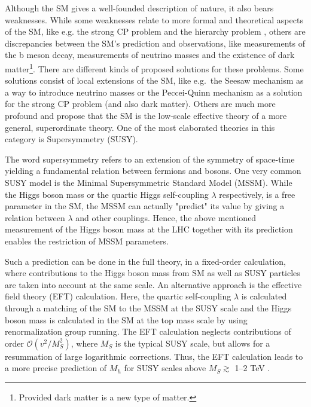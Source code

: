 \documentclass[a4paper,12pt]{book}
\begin{document}
Although the SM gives a well-founded description of nature, it also bears weaknesses. While some weaknesses relate to more formal and theoretical aspects of the SM, like e.g. the strong CP problem \cite{strongcp} and the hierarchy problem \cite{hierarchy}, others are discrepancies between the SM's prediction and observations, like measurements of the b meson decay, measurements of neutrino masses and the existence of dark matter\footnote{Provided dark matter is a new type of matter.}. There are different kinds of proposed solutions for these problems. Some solutions consist of local extensions of the SM, like e.g.\ the Seesaw mechanism \cite{seesaw} as a way to introduce neutrino masses or the Peccei-Quinn mechanism \cite{peccei} as a solution for the strong CP problem (and also dark matter). Others are much more profound and propose that the SM is the low-scale effective theory of a more general, superordinate theory. One of the most elaborated theories in this category is Supersymmetry (SUSY).\par
The word supersymmetry refers to an extension of the symmetry of space-time yielding a fundamental relation between fermions and bosons. One very common SUSY model is the Minimal Supersymmetric Standard Model (MSSM). While the Higgs boson mass or the quartic Higgs self-coupling $\lambda$ respectively, is a free parameter in the SM, the MSSM can actually "predict" its value by giving a relation between $\lambda$ and other couplings. Hence, the above mentioned measurement of the Higgs boson mass at the LHC together with its prediction enables the restriction of MSSM parameters.\par
Such a prediction can be done in the full theory, in a fixed-order calculation, where contributions to the Higgs boson mass from SM as well as SUSY particles are taken into account at the same scale. An alternative approach is the effective field theory (EFT) calculation. Here, the quartic self-coupling $\lambda$ is calculated through a matching of the SM to the MSSM at the SUSY scale and the Higgs boson mass is calculated in the SM at the top mass scale by using renormalization group running. The EFT calculation neglects contributions of order $\mathcal{O}(v^2/M_S^2)$, where $M_S$ is the typical SUSY scale, but allows for a resummation of large logarithmic corrections. Thus, the EFT calculation leads to a more precise prediction of $M_h$ for SUSY scales above $M_S \gtrsim$ 1--2 TeV \cite{susyhd,allanachvoigt,uncertainty}. \par
\end{document}
